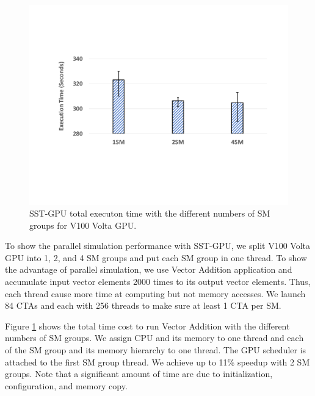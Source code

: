    \begin{figure}[!htb]
      \centering
      \setlength{\abovecaptionskip}{6pt plus 1pt minus 1pt}
      \includegraphics[width=.90\textwidth,keepaspectratio]{figures/par-perf.pdf}
      \captionsetup{width=.90\textwidth}
      \caption{SST-GPU total executon time with the different numbers of SM groups for V100 Volta GPU.}
      \label{fig:par-perf}
   \end{figure}

To show the parallel simulation performance with SST-GPU, we split V100 Volta GPU
into 1, 2, and 4 SM groups and put each SM group in one thread. To show the advantage
of parallel simulation, we use Vector Addition application and accumulate input vector elements
2000 times to its output vector elements. Thus, each thread cause more time at computing
but not memory accesses. We launch 84 CTAs and each with 256 threads to make sure at least
1 CTA per SM.

Figure \ref{fig:par-perf} shows the total time cost to run Vector Addition
with the different numbers of SM groups. We assign CPU and its memory to one thread and
each of the SM group and its memory hierarchy to one thread. The GPU scheduler is attached
to the first SM group thread. We achieve up to 11\% speedup with 2 SM groups. Note that
a significant amount of time are due to initialization, configuration, and memory copy.
